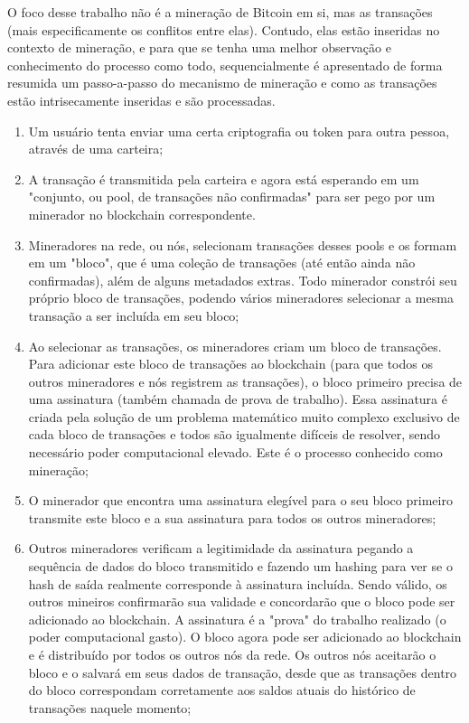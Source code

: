 \documentclass[conference]{IEEEtran}
\begin{document}
O foco desse trabalho não é a mineração de Bitcoin em si, mas as transações (mais especificamente os conflitos entre elas). Contudo, elas estão inseridas no contexto de mineração, e para que se tenha uma melhor observação e conhecimento do processo como todo, sequencialmente é apresentado de forma resumida um passo-a-passo do mecanismo de mineração e como as transações estão intrisecamente inseridas e são processadas. 

\begin{enumerate}
    \item  Um usuário tenta enviar uma certa criptografia ou token para outra pessoa, através de uma carteira;
    
    \item A transação é transmitida pela carteira e agora está esperando em um "conjunto, ou pool, de transações não confirmadas" para ser pego por um minerador no blockchain correspondente.
    
    \item Mineradores na rede, ou nós, selecionam transações desses pools e os formam em um "bloco", que é uma coleção de transações (até então ainda não confirmadas), além de alguns metadados extras. Todo minerador constrói seu próprio bloco de transações, podendo vários mineradores selecionar a mesma transação a ser incluída em seu bloco;
    
    \item Ao selecionar as transações, os mineradores criam um bloco de transações. Para adicionar este bloco de transações ao blockchain (para que todos os outros mineradores e nós registrem as transações), o bloco primeiro precisa de uma assinatura (também chamada de prova de trabalho). Essa assinatura é criada pela solução de um problema matemático muito complexo exclusivo de cada bloco de transações e todos são igualmente difíceis de resolver, sendo necessário poder computacional elevado. Este é o processo conhecido como mineração;
    
    \item O minerador que encontra uma assinatura elegível para o seu bloco primeiro transmite este bloco e a sua assinatura para todos os outros mineradores;
    
    \item Outros mineradores verificam a legitimidade da assinatura pegando a sequência de dados do bloco transmitido e fazendo um hashing para ver se o hash de saída realmente corresponde à assinatura incluída. Sendo válido, os outros mineiros confirmarão sua validade e concordarão que o bloco pode ser adicionado ao blockchain. A assinatura é a "prova" do trabalho realizado (o poder computacional gasto). O bloco agora pode ser adicionado ao blockchain e é distribuído por todos os outros nós da rede. Os outros nós aceitarão o bloco e o salvará em seus dados de transação, desde que as transações dentro do bloco correspondam corretamente aos saldos atuais do histórico de transações naquele momento;
    

\end{enumerate}
\end{document}

